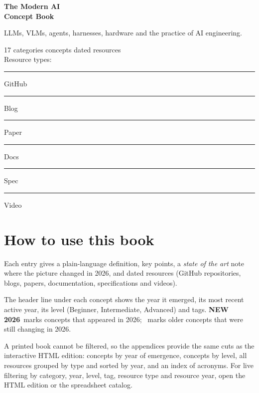 \documentclass[10pt,a4paper,openany]{report}
\newcommand{\newtag}{\colorbox{newc}{\sffamily\scriptsize\bfseries\color{white}NEW 2026}}
\newcommand{\acttag}{\fcolorbox{newc}{white}{\sffamily\scriptsize\color{newc}ACTIVE 2026}}
\begin{document}
\begin{titlepage}
\vspace*{0.3cm}
{\color{white}\sffamily\bfseries\fontsize{42}{44}\selectfont The Modern AI\\[4pt] Concept Book\par}
\vspace{2.4cm}
{\Large LLMs, VLMs, agents, harnesses, hardware and the practice of AI engineering.\par}
\vfill
{\sffamily\small\color{muted}17 categories  concepts  dated resources\\[6pt]
Resource types:\ \textcolor{kG}{\rule{5pt}{5pt}} GitHub\quad \textcolor{kB}{\rule{5pt}{5pt}} Blog\quad \textcolor{kP}{\rule{5pt}{5pt}} Paper\quad \textcolor{kD}{\rule{5pt}{5pt}} Docs\quad \textcolor{kS}{\rule{5pt}{5pt}} Spec\quad \textcolor{kV}{\rule{5pt}{5pt}} Video\par}
\end{titlepage}

\chapter*{How to use this book}
Each entry gives a plain-language definition, key points, a \emph{state of the art} note where the picture changed in 2026, and dated resources (GitHub repositories, blogs, papers, documentation, specifications and videos).

The header line under each concept shows the year it emerged, its most recent active year, its level (Beginner, Intermediate, Advanced) and tags. \newtag\ marks concepts that appeared in 2026; \acttag\ marks older concepts that were still changing in 2026.

A printed book cannot be filtered, so the appendices provide the same cuts as the interactive HTML edition: concepts by year of emergence, concepts by level, all resources grouped by type and sorted by year, and an index of acronyms. For live filtering by category, year, level, tag, resource type and resource year, open the HTML edition or the spreadsheet catalog.
\end{document}
